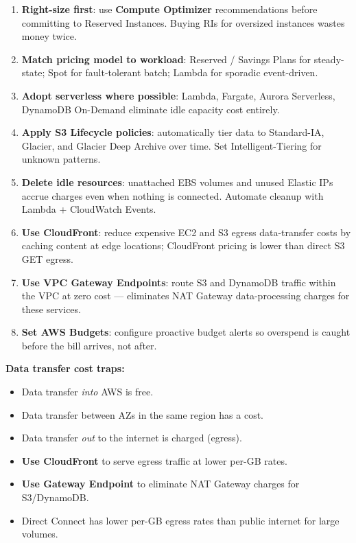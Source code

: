 \begin{enumerate}
  \item \textbf{Right-size first}: use \textbf{Compute Optimizer} recommendations before committing
        to Reserved Instances. Buying RIs for oversized instances wastes money twice.
  \item \textbf{Match pricing model to workload}: Reserved / Savings Plans for steady-state;
        Spot for fault-tolerant batch; Lambda for sporadic event-driven.
  \item \textbf{Adopt serverless where possible}: Lambda, Fargate, Aurora Serverless, DynamoDB
        On-Demand eliminate idle capacity cost entirely.
  \item \textbf{Apply S3 Lifecycle policies}: automatically tier data to Standard-IA, Glacier,
        and Glacier Deep Archive over time. Set Intelligent-Tiering for unknown patterns.
  \item \textbf{Delete idle resources}: unattached EBS volumes and unused Elastic IPs accrue
        charges even when nothing is connected. Automate cleanup with Lambda + CloudWatch Events.
  \item \textbf{Use CloudFront}: reduce expensive EC2 and S3 egress data-transfer costs by
        caching content at edge locations; CloudFront pricing is lower than direct S3 GET egress.
  \item \textbf{Use VPC Gateway Endpoints}: route S3 and DynamoDB traffic within the VPC
        at zero cost --- eliminates NAT Gateway data-processing charges for these services.
  \item \textbf{Set AWS Budgets}: configure proactive budget alerts so overspend is caught before
        the bill arrives, not after.
\end{enumerate}

\begin{examtip}
\textbf{Data transfer cost traps:}
\begin{itemize}
  \item Data transfer \emph{into} AWS is free.
  \item Data transfer between AZs in the same region has a cost.
  \item Data transfer \emph{out} to the internet is charged (egress).
  \item \textbf{Use CloudFront} to serve egress traffic at lower per-GB rates.
  \item \textbf{Use Gateway Endpoint} to eliminate NAT Gateway charges for S3/DynamoDB.
  \item Direct Connect has lower per-GB egress rates than public internet for large volumes.
\end{itemize}
\end{examtip}

